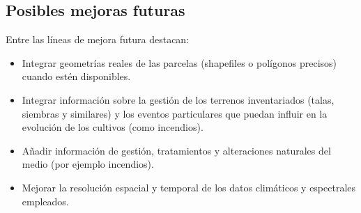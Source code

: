 \subsection*{Posibles mejoras futuras}

Entre las líneas de mejora futura destacan:

\begin{itemize}
    \item Integrar geometrías reales de las parcelas (shapefiles o polígonos precisos) cuando estén disponibles.
    \item Integrar información sobre la gestión de los terrenos inventariados (talas, siembras y similares) y los eventos particulares que puedan influir en la evolución de los cultivos (como incendios).
    \item Añadir información de gestión, tratamientos y alteraciones naturales del medio (por ejemplo incendios).
    \item Mejorar la resolución espacial y temporal de los datos climáticos y espectrales empleados.
\end{itemize}


